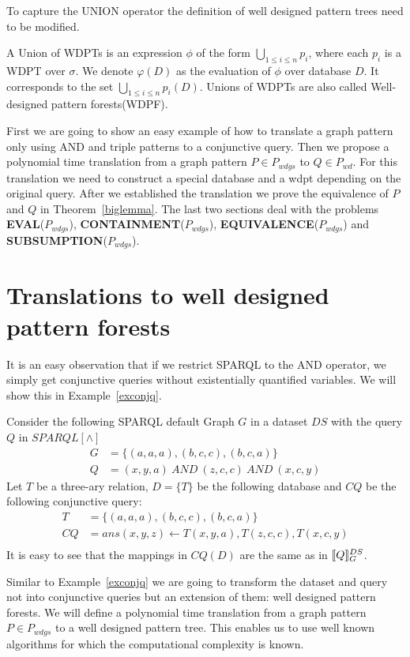 To capture the UNION operator the definition of well designed pattern trees
need to be modified.  
\begin{definition}
	A Union of WDPTs is an expression $\phi$ of the form $\bigcup_{1\leq i \leq n} p_i$, 
	where each $p_i$ is a WDPT over $\sigma$.
	We denote $\varphi(D)$ as the evaluation of $\phi$ over database $D$.
	It corresponds to the set $\bigcup_{1\leq i \leq n}p_i(D)$.
	Unions of WDPTs are also called Well-designed pattern
	forests(WDPF).
\end{definition}



First we are going to show an easy example of how to translate a graph pattern
only using AND and triple patterns to a conjunctive query. Then we propose a
polynomial time translation from a graph pattern $P \in P_{wdgs}$ to $Q \in P_{wd}$. For this
translation we need to construct a special database and a wdpt depending on the
original query. After we established the translation we prove the equivalence of $P$ and $Q$ in
Theorem~\ref{biglemma}. The last two sections deal with the problems
\textbf{EVAL}($P_{wdgs}$), \textbf{CONTAINMENT}($P_{wdgs}$),
\textbf{EQUIVALENCE}($P_{wdgs}$) and \textbf{SUBSUMPTION}($P_{wdgs}$).

\section{Translations to well designed pattern forests}
It is an easy observation that if we restrict SPARQL to the AND operator, we
simply get conjunctive queries without existentially quantified variables.
We will show this in Example~\ref{exconjq}. 
\begin{example}\label{exconjq}
	Consider the following SPARQL default Graph $G$ in a dataset $DS$ with the query $Q$ in $SPARQL[\land]$
	\begin{align*}
		G &=\{ (a,a,a), (b,c,c), (b,c,a)  \}\\
		Q &= (x,y,a) \ AND \ (z,c,c) \ AND \ (x,c,y)
	\end{align*}
	Let $T$ be a three-ary relation, $D = \{ T \}$ be the following database and
	$CQ$ be the following 
	conjunctive query: 
	\begin{align*}
		T &= \{ (a,a,a), (b,c,c), (b,c,a)\}\\
		CQ &= ans(x,y,z) \leftarrow T(x,y,a), T(z,c,c), T(x,c,y)\\
	\end{align*}
	It is easy to see that the mappings in $CQ(D)$ are the same as in $\llbracket Q
	\rrbracket_G^{DS}$.
\end{example}
Similar to Example~\ref{exconjq} we are going to transform the dataset and query 
not into conjunctive queries but an extension of them: well designed pattern forests. We 
will define a polynomial time translation from a graph pattern $P \in P_{wdgs}$
to a well designed pattern tree. This enables us to use well known algorithms 
for which the computational complexity is known. 

